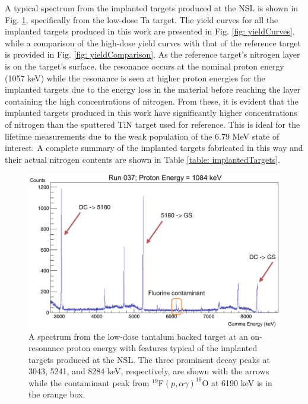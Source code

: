 A typical spectrum from the implanted targets produced at the NSL is shown in Fig. \ref{fig: implantedSpectrum}, specifically from the low-dose Ta target. The yield curves for all the implanted targets produced in this work are presented in Fig. \ref{fig: yieldCurves}, while a comparison of the high-dose yield curves with that of the reference target is provided in Fig. \ref{fig: yieldComparison}. As the reference target's nitrogen layer is on the target's surface, the resonance occurs at the nominal proton energy (1057 keV) while the resonance is seen at higher proton energies for the implanted targets due to the energy loss in the material before reaching the layer containing the high concentrations of nitrogen. From these, it is evident that the implanted targets produced in this work have significantly higher concentrations of nitrogen than the sputtered TiN target used for reference. This is ideal for the lifetime measurements due to the weak population of the 6.79 MeV state of interest. A complete summary of the implanted targets fabricated in this way and their actual nitrogen contents are shown in Table \ref{table: implantedTargets}. 



\begin{figure}
\includegraphics[width=\linewidth]{figures/typicalSpectrum.png}
\caption{A spectrum from the low-dose tantalum backed target at an on-resonance proton energy with features typical of the implanted targets produced at the NSL. The three prominent decay peaks at 3043, 5241, and 8284 keV, respectively, are shown with the arrows while the contaminant peak from $^{19}$F$\left( p, \alpha\gamma \right)^{16}$O at 6190 keV is in the orange box.  }
\label{fig: implantedSpectrum}
\end{figure}

